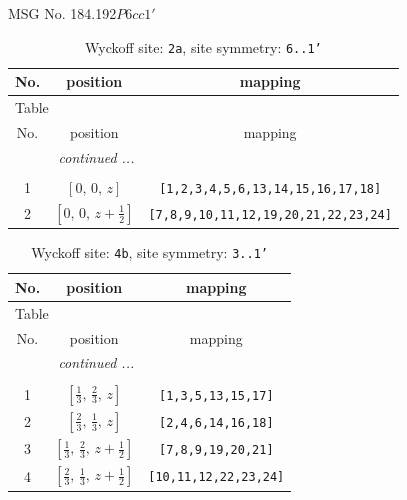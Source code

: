 \documentclass[fleqn,8pt]{jsarticle}
\begin{document}
\setcounter{MaxMatrixCols}{32}

\renewcommand{\tablename}{Table~}
\renewcommand{\figurename}{Figure~}
\begin{center}
\LARGE
MSG No. 184.192\quad$P6cc1'$
\end{center}
\renewcommand{\arraystretch}{1.2}
\begin{longtable}{ccc}
\caption{Wyckoff site: {\tt 2a}, site symmetry: {\tt 6..1'}}
 \\
 \hline \hline
No. & position & mapping \\ \hline \endfirsthead

\multicolumn{2}{l}{\tablename\ \thetable{}} \\
 \hline \hline
No. & position & mapping \\ \hline \endhead

 \hline \hline
\multicolumn{2}{r}{\footnotesize\it continued ...} \\ \endfoot

 \hline \hline
\multicolumn{2}{r}{} \\ \endlastfoot

1 & $\left[ 0,\, 0,\, z \right]$ & {\tt [1,2,3,4,5,6,13,14,15,16,17,18]} \\ \hline
2 & $\left[ 0,\, 0,\, z + \frac{1}{2} \right]$ & {\tt [7,8,9,10,11,12,19,20,21,22,23,24]} \\
\end{longtable}
\renewcommand{\arraystretch}{1.2}
\begin{longtable}{ccc}
\caption{Wyckoff site: {\tt 4b}, site symmetry: {\tt 3..1'}}
 \\
 \hline \hline
No. & position & mapping \\ \hline \endfirsthead

\multicolumn{2}{l}{\tablename\ \thetable{}} \\
 \hline \hline
No. & position & mapping \\ \hline \endhead

 \hline \hline
\multicolumn{2}{r}{\footnotesize\it continued ...} \\ \endfoot

 \hline \hline
\multicolumn{2}{r}{} \\ \endlastfoot

1 & $\left[ \frac{1}{3},\, \frac{2}{3},\, z \right]$ & {\tt [1,3,5,13,15,17]} \\ \hline
2 & $\left[ \frac{2}{3},\, \frac{1}{3},\, z \right]$ & {\tt [2,4,6,14,16,18]} \\ \hline
3 & $\left[ \frac{1}{3},\, \frac{2}{3},\, z + \frac{1}{2} \right]$ & {\tt [7,8,9,19,20,21]} \\ \hline
4 & $\left[ \frac{2}{3},\, \frac{1}{3},\, z + \frac{1}{2} \right]$ & {\tt [10,11,12,22,23,24]} \\
\end{longtable}
\end{document}
